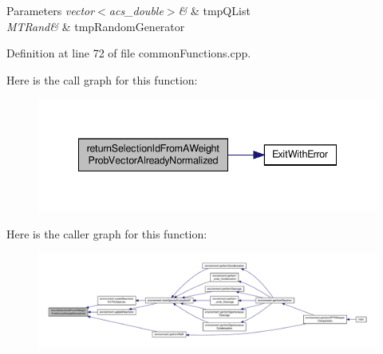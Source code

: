 \begin{DoxyParams}{Parameters}
{\em vector$<$acs\-\_\-double$>$\&} & tmp\-Q\-List \\
\hline
{\em M\-T\-Rand\&} & tmp\-Random\-Generator \\
\hline
\end{DoxyParams}


Definition at line 72 of file common\-Functions.\-cpp.



Here is the call graph for this function\-:\nopagebreak
\begin{figure}[H]
\begin{center}
\leavevmode
\includegraphics[width=338pt]{a00069_a4135ff15fd24eb8fbfee3d00e1cfbf20_cgraph}
\end{center}
\end{figure}




Here is the caller graph for this function\-:\nopagebreak
\begin{figure}[H]
\begin{center}
\leavevmode
\includegraphics[width=350pt]{a00069_a4135ff15fd24eb8fbfee3d00e1cfbf20_icgraph}
\end{center}
\end{figure}



